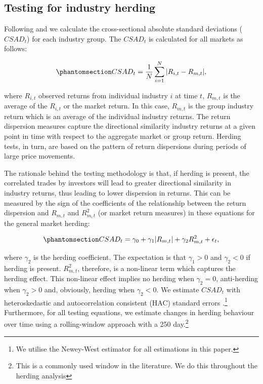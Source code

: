 \documentclass[
  letterpaper,
  DIV=11,
  numbers=noendperiod]{scrartcl}
\begin{document}
\subsection{Testing for industry
herding}\label{testing-for-industry-herding}

Following \citet{christie1995following} and \citet{chang2000examination}
we calculate the cross-sectional absolute standard deviations
(\(CSAD_{t}\)) for each industry group. The \(CSAD_{t}\) is calculated
for all markets as follows:

\begin{equation}\phantomsection\label{eq-csad}{CSAD_{t} = \frac{1}{N}\sum_{i =1}^{N}{|R_{i,t} - R_{m,t}|},}\end{equation}

where \(R_{i,t}\) observed returns from individual industry \(i\) at
time \(t\), \(R_{m,t}\) is the average of the \(R_{i,t}\) or the market
return. In this case, \(R_{m,t}\) is the group industry return which is
an average of the individual industry returns. The return dispersion
measures capture the directional similarity industry returns at a given
point in time with respect to the aggregate market or group return.
Herding tests, in turn, are based on the pattern of return dispersions
during periods of large price movements.

The rationale behind the testing methodology is that, if herding is
present, the correlated trades by investors will lead to greater
directional similarity in industry returns, thus leading to lower
dispersion in returns. This can be measured by the sign of the
coefficients of the relationship between the return dispersion and
\(R_{m, t}\) and \(R_{m, t}^2\) (or market return measures) in these
equations for the general market herding:

\begin{equation}\phantomsection\label{eq-csad2}{CSAD_{t} = \gamma_0 +  \gamma_1|R_{m, t}| +  \gamma_2R_{m, t}^2 + \epsilon_{t},
}\end{equation}

where \(\gamma_2\) is the herding coefficient. The expectation is that
\(\gamma_1 > 0\) and \(\gamma_2 < 0\) if herding is present.
\(R_{m, t}^2\), therefore, is a non-linear term which captures the
herding effect. This non-linear effect implies no herding when
\(\gamma_2 = 0\), anti-herding when \(\gamma_2 > 0\) and, obviously,
herding when \(\gamma_2 < 0\). We estimate \(CSAD_{t}\) with
heteroskedastic and autocorrelation consistent (HAC) standard errors
\citep[See][]{newey1987simple}.\footnote{We utilise the Newey-West
  estimator for all estimations in this paper.} Furthermore, for all
testing equations, we estimate changes in herding behaviour over time
using a rolling-window approach with a 250 day.\footnote{This is a
  commonly used window in the literature. We do this throughout the
  herding analysis}
\end{document}
